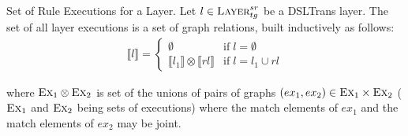 \begin{definition}{Set of Rule Executions for a Layer.}
\label{def:rule_exec_set}
Let $l\in \textsc{Layer}^{sr}_{tg}$ be a DSLTrans layer. The set of all layer
executions is a set of graph relations, built inductively as follows:
\begin{gather*}
  \llbracket l\rrbracket = 
  \begin{cases}
    \emptyset &\text{if}\; l=\emptyset\\
    \llbracket l_1\rrbracket \otimes \llbracket rl\rrbracket &\text{if}\;
    l = l_1\cup rl
  \end{cases}
\end{gather*}  

where $\textsc{Ex}_1 \otimes \textsc{Ex}_2$ is set of the unions of pairs of
graphs $(ex_1,ex_2)\in \textsc{Ex}_1 \times \textsc{Ex}_2$ ($\textsc{Ex}_1$ and
$\textsc{Ex}_2$ being sets of executions) where the match elements of $ex_1$ and
the match elements of $ex_2$ may be joint.
\end{definition}

